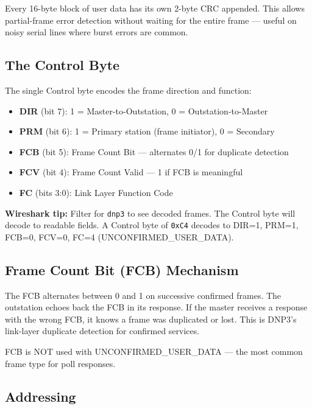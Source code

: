 \documentclass[11pt,twoside]{article}
\begin{document}
Every 16-byte block of user data has its own 2-byte CRC appended. This allows partial-frame error detection without waiting for the entire frame --- useful on noisy serial lines where burst errors are common.

\subsection{The Control Byte}

The single Control byte encodes the frame direction and function:

\begin{itemize}[noitemsep]
  \item \textbf{DIR} (bit 7): 1 = Master-to-Outstation, 0 = Outstation-to-Master
  \item \textbf{PRM} (bit 6): 1 = Primary station (frame initiator), 0 = Secondary
  \item \textbf{FCB} (bit 5): Frame Count Bit --- alternates 0/1 for duplicate detection
  \item \textbf{FCV} (bit 4): Frame Count Valid --- 1 if FCB is meaningful
  \item \textbf{FC} (bits 3:0): Link Layer Function Code
\end{itemize}

\begin{probox}
\textbf{Wireshark tip:} Filter for \texttt{dnp3} to see decoded frames. The Control byte will decode to readable fields. A Control byte of \texttt{0xC4} decodes to DIR=1, PRM=1, FCB=0, FCV=0, FC=4 (UNCONFIRMED\_USER\_DATA).
\end{probox}

\subsection{Frame Count Bit (FCB) Mechanism}

The FCB alternates between 0 and 1 on successive confirmed frames. The outstation echoes back the FCB in its response. If the master receives a response with the wrong FCB, it knows a frame was duplicated or lost. This is DNP3's link-layer duplicate detection for confirmed services.

FCB is NOT used with UNCONFIRMED\_USER\_DATA --- the most common frame type for poll responses.

\subsection{Addressing}
\end{document}
